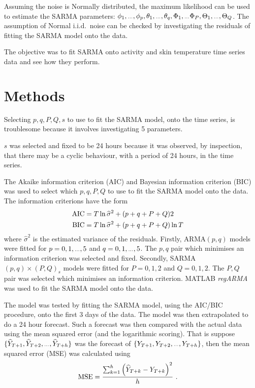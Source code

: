 \documentclass[a4paper]{proc}
\newcommand{\dotdotdot}{\vphantom{.}_{\cdots}}
\begin{document}
Assuming the noise is Normally distributed, the maximum likelihood can be used to estimate the SARMA parameters: $\phi_1,\dotdotdot,\phi_p,\theta_1,\dotdotdot,\theta_q,\Phi_1,\dotdotdot\Phi_P,\Theta_1,\dotdotdot,\Theta_Q$. The assumption of Normal i.i.d.~noise can be checked by investigating the residuals of fitting the SARMA model onto the data.

The objective was to fit SARMA onto activity and skin temperature time series data and see how they perform.

\section{Methods}
Selecting $p,q,P,Q,s$ to use to fit the SARMA model, onto the time series, is troublesome because it involves investigating 5 parameters.

$s$ was selected and fixed to be 24 hours because it was observed, by inspection, that there may be a cyclic behaviour, with a period of 24 hours, in the time series.

The Akaike information criterion (AIC) and Bayesian information criterion (BIC) was used to select which $p,q,P,Q$ to use to fit the SARMA model onto the data. The information criterions have the form
\begin{align}
\textup{AIC}&=T\ln{\widehat{\sigma}^2}+(p+q+P+Q)2\\
\textup{BIC}&=T\ln{\widehat{\sigma}^2}+(p+q+P+Q)\ln{T}
\end{align}
where $\widehat{\sigma}^2$ is the estimated variance of the residuals. Firstly, ARMA$(p,q)$ models were fitted for $p=0,1,\dotdotdot,5$ and $q=0,1,\dotdotdot,5$. The $p,q$ pair which minimises an information criterion was selected and fixed. Secondly, SARMA$(p,q)\times(P,Q)_s$ models were fitted for $P=0,1,2$ and $Q=0,1,2$. The $P,Q$ pair was selected which minimises an information criterion. MATLAB \emph{regARMA} was used to fit the SARMA model onto the data.

The model was tested by fitting the SARMA model, using the AIC/BIC procedure, onto the first 3 days of the data. The model was then extrapolated to do a 24 hour forecast. Such a forecast was then compared with the actual data using the mean squared error (and the logarithmic scoring). That is suppose $\{\widehat{Y}_{T+1},\widehat{Y}_{T+2},\dotdotdot,\widehat{Y}_{T+h}\}$ was the forecast of $\{{Y}_{T+1},{Y}_{T+2},\dotdotdot,{Y}_{T+h}\}$, then the mean squared error (MSE) was calculated using
\begin{equation}
\textup{MSE} = \frac{\sum_{k=1}^{h}\left(\widehat{Y}_{T+k}-Y_{T+k}\right)^2}{h} \ .
\end{equation}
\end{document}
